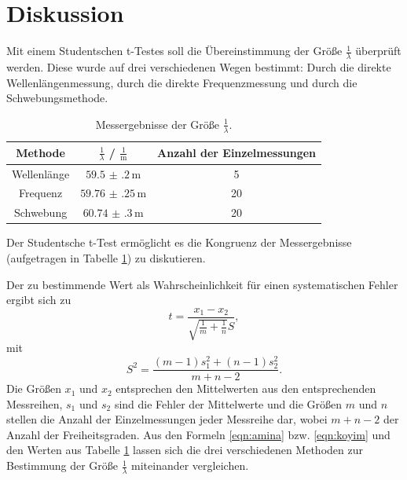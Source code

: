 \section{Diskussion}
\label{sec:Diskussion}
Mit einem Studentschen t-Testes soll die Übereinstimmung der Größe $\frac{1}{\lambda}$
überprüft werden. Diese wurde auf drei verschiedenen Wegen bestimmt: Durch die direkte 
Wellenlängenmessung, durch die direkte Frequenzmessung und durch die Schwebungsmethode.

\begin{table}
	\centering
	\caption{Messergebnisse der Größe $\frac{1}{\lambda}$.}
	\label{tab:alam}
	\begin{tabular}{ccc}
		\toprule
		Methode & $\frac{1}{\lambda}$ / $\frac{1}{\si{\meter}}$ & Anzahl der Einzelmessungen \\
		\midrule
		Wellenlänge & $\num{59.5(2)} \, \si{\meter}$ & 5         \\
		Frequenz & $\num{59.76(25)} \, \si{\meter}$ & 20  \\
		Schwebung & $\num{60.74(30)} \, \si{\meter}$ & 20  \\
		\bottomrule
	\end{tabular}
\end{table}
Der Studentsche t-Test ermöglicht es die Kongruenz der Messergebnisse (aufgetragen in Tabelle
\ref{tab:alam}) zu diskutieren.

Der zu bestimmende Wert \cite{ttest} als Wahrscheinlichkeit für einen systematischen Fehler 
ergibt sich zu
\begin{equation}
	\label{eqn:amina}
	t = \frac{x_1 - x_2}{\sqrt{\frac{1}{m} + \frac{1}{n}} S} \mathrm{,}
\end{equation}
mit 
\begin{equation}
	\label{eqn:koyim}
	S^2 = \frac{(m-1)s_1^2 + (n-1)s_2^2}{m+n-2} \mathrm{.}
\end{equation}
Die Größen $x_1$ und $x_2$ entsprechen den Mittelwerten aus den entsprechenden Messreihen, 
$s_1$ und $s_2$ sind die Fehler der Mittelwerte und die Größen $m$ und $n$ stellen die 
Anzahl der Einzelmessungen jeder Messreihe dar, wobei $m+n-2$ der Anzahl der Freiheitsgraden.
Aus den Formeln \eqref{eqn:amina} bzw. \eqref{eqn:koyim} und den Werten aus Tabelle 
\ref{tab:alam} lassen sich die drei verschiedenen Methoden zur Bestimmung der Größe 
$\frac{1}{\lambda}$ miteinander vergleichen.

